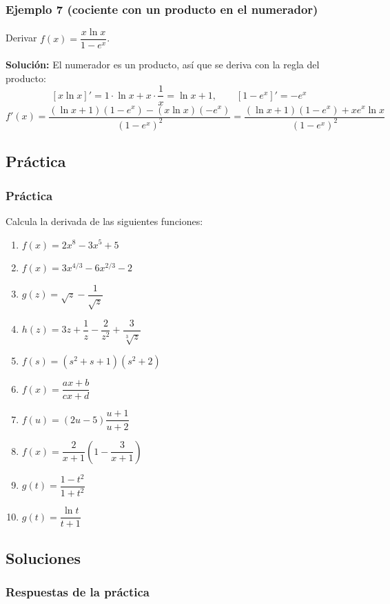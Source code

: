 \documentclass[12pt]{article}
\begin{document}
\subsubsection{Ejemplo 7 (cociente con un producto en el numerador)}


Derivar $f(x) = \dfrac{x \ln x}{1 - e^x}$.

\textbf{Solución:} El numerador es un producto, así que se deriva con la regla del producto:
\[
[x \ln x]' = 1 \cdot \ln x + x \cdot \frac{1}{x} = \ln x + 1, \qquad [1 - e^x]' = -e^x
\]
\[
f'(x) = \frac{(\ln x + 1)(1 - e^x) - (x \ln x)(-e^x)}{(1 - e^x)^2} = \frac{(\ln x + 1)(1 - e^x) + x e^x \ln x}{(1 - e^x)^2}
\]



\subsection{Práctica}

\subsubsection{Práctica}


Calcula la derivada de las siguientes funciones:
\begin{enumerate}
    \item $f(x) = 2x^8 - 3x^5 + 5$
    \item $f(x) = 3x^{4/3} - 6x^{2/3} - 2$
    \item $g(z) = \sqrt{z} - \dfrac{1}{\sqrt{z}}$
    \item $h(z) = 3z + \dfrac{1}{z} - \dfrac{2}{z^2} + \dfrac{3}{\sqrt[3]{z}}$
    \item $f(s) = (s^2 + s + 1)(s^2 + 2)$
    \item $f(x) = \dfrac{ax + b}{cx + d}$
    \item $f(u) = (2u - 5)\dfrac{u + 1}{u + 2}$
    \item $f(x) = \dfrac{2}{x + 1}\left(1 - \dfrac{3}{x + 1}\right)$
    \item $g(t) = \dfrac{1 - t^2}{1 + t^2}$
    \item $g(t) = \dfrac{\ln t}{t + 1}$
\end{enumerate}



\subsection{Soluciones}

\subsubsection{Respuestas de la práctica}
\end{document}
